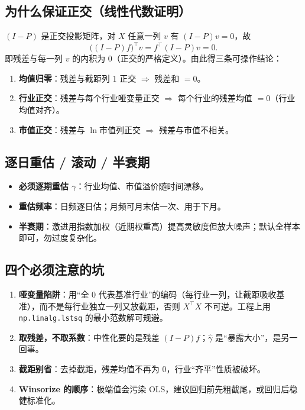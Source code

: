 \documentclass[UTF8,11pt]{ctexart}
\newcommand{\codeinl}[1]{\texttt{#1}}
\begin{document}
\subsection{为什么保证正交（线性代数证明）}
$(I-P)$ 是正交投影矩阵，对 $X$ 任意一列 $v$ 有 $(I-P)v=0$，故
\begin{equation}
\big((I-P)f\big)^{\top}v = f^{\top}(I-P)v = 0.
\end{equation}
即残差与每一列 $v$ 的内积为 0（正交的严格定义）。由此得三条可操作结论：
\begin{enumerate}[itemsep=2pt]
\item \textbf{均值归零}：残差与截距列 $1$ 正交 $\Rightarrow$ 残差和 $=0$。
\item \textbf{行业正交}：残差与每个行业哑变量正交 $\Rightarrow$ 每个行业的残差均值 $=0$（行业均值对齐）。
\item \textbf{市值正交}：残差与 $\ln$市值列正交 $\Rightarrow$ 残差与市值不相关。
\end{enumerate}

\subsection{逐日重估 / 滚动 / 半衰期}
\begin{itemize}[itemsep=2pt]
\item \textbf{必须逐期重估 $\gamma$}：行业均值、市值溢价随时间漂移。
\item \textbf{重估频率}：日频逐日估；月频可月末估一次、用于下月。
\item \textbf{半衰期}：激进用指数加权（近期权重高）提高灵敏度但放大噪声；默认全样本即可，勿过度复杂化。
\end{itemize}

\subsection{四个必须注意的坑}
\begin{enumerate}[itemsep=2pt]
\item \textbf{哑变量陷阱}：用“全 0 代表基准行业”的编码（每行业一列，让截距吸收基准），而不是每行业独立一列又放截距，否则 $X^{\top}X$ 不可逆。工程上用 \codeinl{np.linalg.lstsq} 的最小范数解可规避。
\item \textbf{取残差，不取系数}：中性化要的是残差 $(I-P)f$；$\hat\gamma$ 是“暴露大小”，是另一回事。
\item \textbf{截距别省}：去掉截距，残差均值不再为 0，行业“齐平”性质被破坏。
\item \textbf{Winsorize 的顺序}：极端值会污染 OLS，建议回归前先粗截尾，或回归后稳健标准化。
\end{enumerate}
\end{document}
